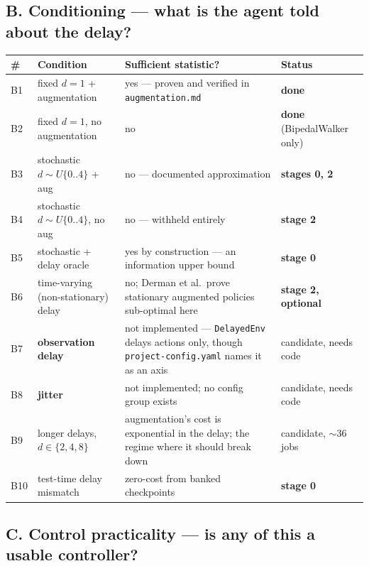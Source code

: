\documentclass[11pt]{article}
\newcommand{\code}[1]{\texttt{\small #1}}
\begin{document}
\subsection{B. Conditioning --- what is the agent told about the delay?}

\begin{center}\footnotesize
\begin{tabular}{@{}lp{}p{}p{}@{}}
\toprule
\textbf{\#} & \textbf{Condition} & \textbf{Sufficient statistic?} & \textbf{Status} \\
\midrule
B1 & fixed $d{=}1$ + augmentation & yes --- proven and verified in \code{augmentation.md} & \textbf{done} \\
B2 & fixed $d{=}1$, no augmentation & no & \textbf{done} (BipedalWalker only) \\
B3 & stochastic $d \sim U\{0..4\}$ + aug & no --- documented approximation & \textbf{stages 0, 2} \\
B4 & stochastic $d \sim U\{0..4\}$, no aug & no --- withheld entirely & \textbf{stage 2} \\
B5 & stochastic + delay oracle & yes by construction --- an information upper bound & \textbf{stage 0} \\
B6 & time-varying (non-stationary) delay & no; Derman et al.\ prove stationary augmented policies sub-optimal here & \textbf{stage 2, optional} \\
B7 & \textbf{observation delay} & not implemented --- \code{DelayedEnv} delays actions only, though \code{project-config.yaml} names it as an axis & candidate, needs code \\
B8 & \textbf{jitter} & not implemented; no config group exists & candidate, needs code \\
B9 & longer delays, $d \in \{2,4,8\}$ & augmentation's cost is exponential in the delay; the regime where it should break down & candidate, ${\sim}$36 jobs \\
B10 & test-time delay mismatch & zero-cost from banked checkpoints & \textbf{stage 0} \\
\bottomrule
\end{tabular}
\end{center}

\subsection{C. Control practicality --- is any of this a usable controller?}
\end{document}
